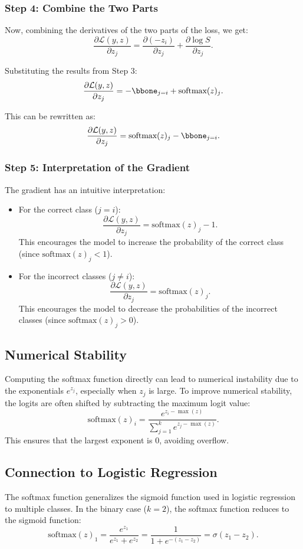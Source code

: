 \begin{notechapter}
\subsubsection{Step 4: Combine the Two Parts}
Now, combining the derivatives of the two parts of the loss, we get:
\[
\frac{\partial \mathcal{L}(y, z)}{\partial z_j} = \frac{\partial (-z_i)}{\partial z_j} + \frac{\partial \log S}{\partial z_j}.
\]

Substituting the results from Step 3:
\[
\frac{\partial \mathcal{L}(y, z)}{\partial z_j} = -\bbone_{j = i} + \text{softmax}(z)_j.
\]

This can be rewritten as:
\[
\frac{\partial \mathcal{L}(y, z)}{\partial z_j} = \text{softmax}(z)_j - \bbone_{j = i}.
\]

\subsubsection{Step 5: Interpretation of the Gradient}
The gradient has an intuitive interpretation:
\begin{itemize}
    \item For the correct class (\( j = i \)):
          \[
          \frac{\partial \mathcal{L}(y, z)}{\partial z_j} = \text{softmax}(z)_j - 1.
          \]
          This encourages the model to increase the probability of the correct class (since \( \text{softmax}(z)_j < 1 \)).

    \item For the incorrect classes (\( j \neq i \)):
          \[
          \frac{\partial \mathcal{L}(y, z)}{\partial z_j} = \text{softmax}(z)_j.
          \]
          This encourages the model to decrease the probabilities of the incorrect classes (since \( \text{softmax}(z)_j > 0 \)).
\end{itemize}

\subsection{Numerical Stability}
Computing the softmax function directly can lead to numerical instability due to the exponentials \( e^{z_j} \), especially when \( z_j \) is large. To improve numerical stability, the logits are often shifted by subtracting the maximum logit value:
\[
\text{softmax}(z)_i = \frac{e^{z_i - \max(z)}}{\sum_{j=1}^k e^{z_j - \max(z)}}.
\]
This ensures that the largest exponent is 0, avoiding overflow.

\subsection{Connection to Logistic Regression}
The softmax function generalizes the sigmoid function used in logistic regression to multiple classes. In the binary case (\( k = 2 \)), the softmax function reduces to the sigmoid function:
\[
\text{softmax}(z)_1 = \frac{e^{z_1}}{e^{z_1} + e^{z_2}} = \frac{1}{1 + e^{-(z_1 - z_2)}} = \sigma(z_1 - z_2).
\]


\end{notechapter}
